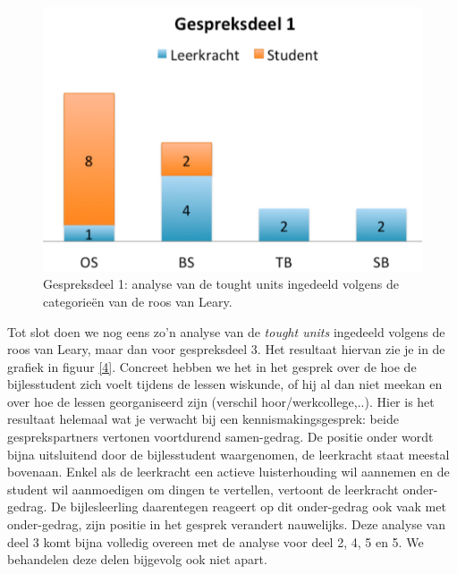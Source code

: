 \documentclass[a4paper,12pt]{article}
\theoremstyle{definition}
\begin{document}
\begin{figure}
  \centering
  \includegraphics[scale=0.6]{grafiek3.png}\caption{Gespreksdeel 1: analyse van 
de tought units ingedeeld volgens de categorieën van de roos van Leary.}\label{3}
\end{figure}
Tot slot doen we nog eens zo'n analyse van de \emph{tought units} ingedeeld volgens de roos van Leary, maar dan 
voor gespreksdeel 3. Het resultaat hiervan zie je in de grafiek in figuur 
\ref{4}. Concreet hebben we het in het gesprek over de hoe de bijlesstudent zich voelt tijdens de lessen wiskunde, of hij al dan niet meekan en over hoe de lessen georganiseerd zijn (verschil hoor/werkcollege,..). 
Hier is het resultaat helemaal wat je verwacht bij een 
kennismakingsgesprek: beide gesprekspartners vertonen voortdurend samen-gedrag. De positie onder wordt bijna uitsluitend door
de bijlesstudent waargenomen, de leerkracht  staat meestal bovenaan. Enkel als 
de leerkracht een actieve luisterhouding wil aannemen en de student wil 
aanmoedigen om dingen te vertellen, vertoont de leerkracht onder-gedrag. De 
bijlesleerling daarentegen reageert op dit onder-gedrag ook vaak met 
onder-gedrag, zijn positie in het gesprek verandert nauwelijks. Deze analyse van 
deel 3 komt bijna volledig overeen met de analyse voor deel 2, 4, 5 en 5. We 
behandelen deze delen bijgevolg ook niet apart.
\end{document}
